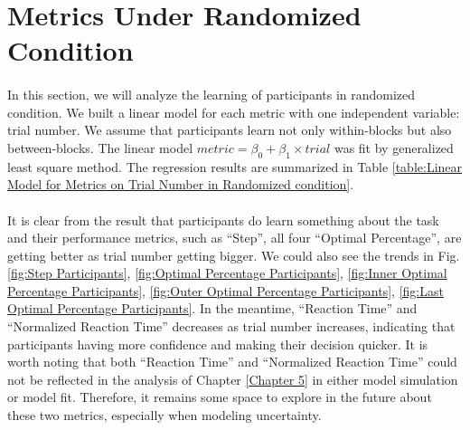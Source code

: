 \section{Metrics Under Randomized Condition}
\label{sec:Metrics Under Randomized Condition}
\paragraph{}
In this section, we will analyze the learning of participants in randomized condition. We built a linear model for each metric with one independent variable: trial number. We assume that participants learn not only within-blocks but also between-blocks. The linear model $metric = {\beta}_0 + {\beta}_1 \times trial$ was fit by generalized least square method. The regression results are summarized in Table \ref{table:Linear Model for Metrics on Trial Number in Randomized condition}. 
\paragraph{}
It is clear from the result that participants do learn something about the task and their performance metrics, such as \enquote{Step}, all four \enquote{Optimal Percentage}, are getting better as trial number getting bigger. We could also see the trends in Fig. \ref{fig:Step Participants}, \ref{fig:Optimal Percentage Participants}, \ref{fig:Inner Optimal Percentage Participants}, \ref{fig:Outer Optimal Percentage Participants}, \ref{fig:Last Optimal Percentage Participants}. In the meantime, \enquote{Reaction Time} and \enquote{Normalized Reaction Time} decreases as trial number increases, indicating that participants having more confidence and making their decision quicker. It is worth noting that both \enquote{Reaction Time} and \enquote{Normalized Reaction Time} could not be reflected in the analysis of Chapter \ref{Chapter 5} in either model simulation or model fit. Therefore, it remains some space to explore in the future about these two metrics, especially when modeling uncertainty. 

